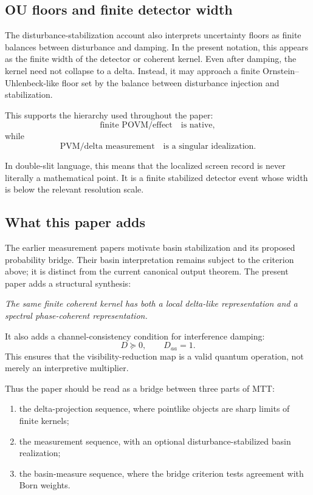 \documentclass[11pt]{article}
\begin{document}
\subsection{OU floors and finite detector width}
\label{subsec:ou-floors-detector-width}

The disturbance-stabilization account also interprets uncertainty floors as finite balances
between disturbance and damping. In the present notation, this appears as the finite width of
the detector or coherent kernel. Even after damping, the kernel need not collapse to a delta.
Instead, it may approach a finite Ornstein--Uhlenbeck-like floor set by the balance between
disturbance injection and stabilization.

This supports the hierarchy used throughout the paper:
\begin{equation}
  \text{finite POVM/effect}
  \quad\text{is native},
\end{equation}
while
\begin{equation}
  \text{PVM/delta measurement}
  \quad\text{is a singular idealization}.
\end{equation}

In double-slit language, this means that the localized screen record is never literally a
mathematical point. It is a finite stabilized detector event whose width is below the relevant
resolution scale.

\subsection{What this paper adds}
\label{subsec:what-this-paper-adds}

The earlier measurement papers motivate basin stabilization and its proposed probability
bridge. Their basin interpretation remains subject to the criterion above; it is distinct
from the current canonical output theorem. The present paper adds a structural synthesis:
\begin{center}
\emph{The same finite coherent kernel has both a local delta-like representation and a
spectral phase-coherent representation.}
\end{center}
It also adds a channel-consistency condition for interference damping:
\begin{equation}
  D\succeq0,
  \qquad
  D_{aa}=1.
\end{equation}
This ensures that the visibility-reduction map is a valid quantum operation, not merely an
interpretive multiplier.

Thus the paper should be read as a bridge between three parts of MTT:
\begin{enumerate}[label=(\roman*)]
  \item the delta-projection sequence, where pointlike objects are sharp limits of finite kernels;
  \item the measurement sequence, with an optional disturbance-stabilized basin realization;
  \item the basin-measure sequence, where the bridge criterion tests agreement with Born weights.
\end{enumerate}
\end{document}
